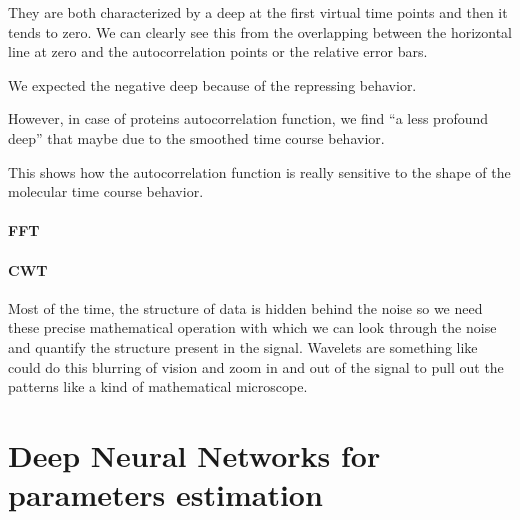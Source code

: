 \documentclass[12pt,a4paper]{report}
\begin{document}
They are both characterized by a deep at the first virtual time points and then it tends to zero. We can clearly see this from the overlapping between the horizontal line at zero and the autocorrelation points or the relative error bars.

We expected the negative deep because of the repressing behavior.

However, in case of proteins autocorrelation function, we find ``a less profound deep'' that maybe due to the smoothed time course behavior.

This shows how the autocorrelation function is really sensitive to the shape of the molecular time course behavior.  

\newpage







\subsection{FFT}


\subsection{CWT}
Most of the time, the structure of data is hidden behind the noise so we need these precise mathematical operation with which we can look through the noise and quantify the structure present in the signal. Wavelets are something like could do this blurring of vision and zoom in and out of the signal to pull out the patterns like a kind of mathematical microscope.

\part{Deep Neural Networks for parameters estimation}
\end{document}
